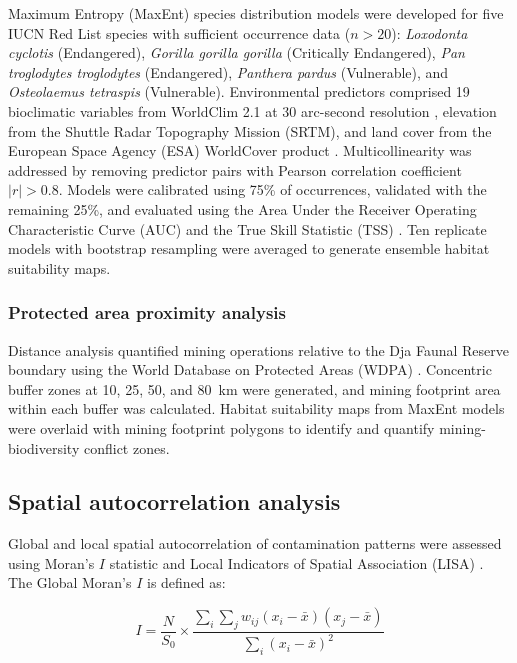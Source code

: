\documentclass[preprint,12pt,number]{elsarticle}
\begin{document}
Maximum Entropy (MaxEnt) species distribution models \cite{Phillips2006} were developed for five IUCN Red List species with sufficient occurrence data ($n > 20$): \textit{Loxodonta cyclotis} (Endangered), \textit{Gorilla gorilla gorilla} (Critically Endangered), \textit{Pan troglodytes troglodytes} (Endangered), \textit{Panthera pardus} (Vulnerable), and \textit{Osteolaemus tetraspis} (Vulnerable). Environmental predictors comprised 19 bioclimatic variables from WorldClim 2.1 at 30 arc-second resolution \cite{Fick2017}, elevation from the Shuttle Radar Topography Mission (SRTM), and land cover from the European Space Agency (ESA) WorldCover product \cite{Zanaga2021}. Multicollinearity was addressed by removing predictor pairs with Pearson correlation coefficient $|r| > 0.8$. Models were calibrated using 75\% of occurrences, validated with the remaining 25\%, and evaluated using the Area Under the Receiver Operating Characteristic Curve (AUC) and the True Skill Statistic (TSS) \cite{Allouche2006}. Ten replicate models with bootstrap resampling were averaged to generate ensemble habitat suitability maps.

\subsubsection{Protected area proximity analysis}

Distance analysis quantified mining operations relative to the Dja Faunal Reserve boundary using the World Database on Protected Areas (WDPA) \cite{UNEPWCMC2024}. Concentric buffer zones at 10, 25, 50, and 80~km were generated, and mining footprint area within each buffer was calculated. Habitat suitability maps from MaxEnt models were overlaid with mining footprint polygons to identify and quantify mining-biodiversity conflict zones.


\subsection{Spatial autocorrelation analysis}

Global and local spatial autocorrelation of contamination patterns were assessed using Moran's $I$ statistic \cite{Moran1950} and Local Indicators of Spatial Association (LISA) \cite{Anselin1995}. The Global Moran's $I$ is defined as:

\begin{equation}
I = \frac{N}{S_0} \times \frac{\sum_i \sum_j w_{ij}(x_i - \bar{x})(x_j - \bar{x})}{\sum_i (x_i - \bar{x})^2}
\label{eq:moran}
\end{equation}
\end{document}

